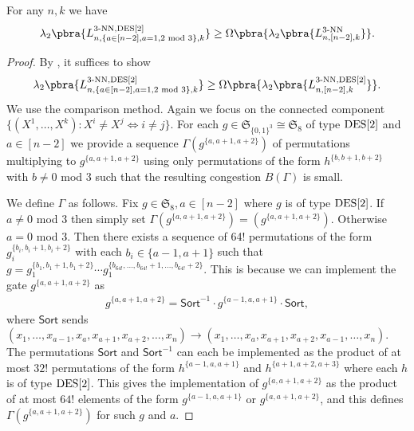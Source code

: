 \begin{lemma}\label{lem:012 to 01}
    For any $n,k$ we have
    \begin{align*}
       \lambda_2\pbra{L_{n,\{a\in[n-2],a=1,2\text{ mod } 3\},k}^{3\text{-NN},\des{2}}}\geq  \Omega\pbra{\lambda_2\pbra{L_{n,[n-2],k}^{3\text{-NN}}}}.
    \end{align*}
\end{lemma}
\begin{proof}
    By , it suffices to show 
    \begin{align*}
       \lambda_2\pbra{L_{n,\{a\in[n-2],a=1,2\text{ mod } 3\},k}^{3\text{-NN},\des{2}}}\geq  \Omega\pbra{\lambda_2\pbra{L_{n,[n-2],k}^{3\text{-NN},\des{2}}}}.
    \end{align*}
    We use the comparison method. Again we focus on the connected component $\{(X^1,\dots,X^{k}):X^i\neq X^j\iff i\neq j\}$. For each $g\in\mathfrak{S}_{\{0,1\}^3}\cong \mathfrak{S}_8$ of type $\mathrm{DES}[2]$ and $a\in[n-2]$ we provide a sequence $\Gamma(g^{\{a,a+1,a+2\}})$ of permutations multiplying to $g^{\{a,a+1,a+2\}}$ using only permutations of the form $h^{\{b,b+1,b+2\}}$ with $b\neq 0$ mod 3 such that the resulting congestion $B(\Gamma)$ is small. 

    We define $\Gamma$ as follows. Fix $g\in\mathfrak{S}_8,a\in[n-2]$ where $g$ is of type $\mathrm{DES}[2]$. If $a\neq 0$ mod 3 then simply set $\Gamma(g^{\{a,a+1,a+2\}})=(g^{\{a,a+1,a+2\}})$. Otherwise $a=0$ mod 3. Then there exists a sequence of 64! permutations of the form $g_i^{\{b_i,b_i+1,b_i+2\}}$ with each $b_i\in \{a-1,a+1\}$ such that $g=g_1^{\{b_1,b_1+1,b_{1}+2\}}\cdots g_1^{\{b_{64!},\dots,b_{64!}+1,\dots,b_{64!}+2\}}$. This is because we can implement the gate $g^{\{a,a+1,a+2\}}$ as 
    \begin{align*}
        g^{\{a,a+1,a+2\}}=\mathsf{Sort}^{-1} \cdot g^{\{a-1,a,a+1\}}\cdot\mathsf{Sort},
    \end{align*}
    where $\mathsf{Sort}$ sends $(x_1,\dots,x_{a-1},x_a,x_{a+1},x_{a+2},\dots,x_n)\to (x_1,\dots,x_a,x_{a+1},x_{a+2},x_{a-1},\dots,x_n)$. The permutations $\mathsf{Sort}$ and $\mathsf{Sort}^{-1}$ can each be implemented as the product of at most $32!$ permutations of the form $h^{\{a-1,a,a+1\}}$ and $h^{\{a+1,a+2,a+3\}}$ where each $h$ is of type $\mathrm{DES}[2]$. This gives the implementation of $g^{\{a,a+1,a+2\}}$ as the product of at most $64!$ elements of the form $g^{\{a-1,a,a+1\}}$ or $g^{\{a,a+1,a+2\}}$, and this defines $\Gamma(g^{\{a,a+1,a+2\}})$ for such $g$ and $a$. 
    

\end{proof}
